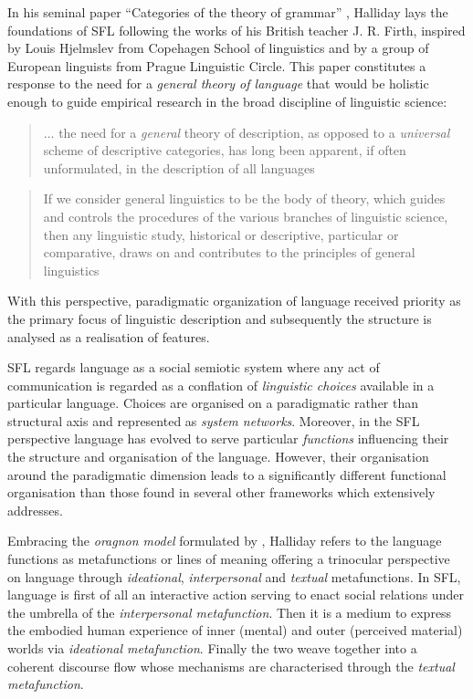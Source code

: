 In his seminal paper ``Categories of the theory of grammar'' \citep{Halliday61-orig}, Halliday lays the foundations of SFL following the works of his British teacher J. R. Firth, inspired by Louis Hjelmslev \citep{Hjelmslev53} from Copehagen School of linguistics and by a group of European linguists from Prague Linguistic Circle. This paper constitutes a response to the need for a \textit{general theory of language} that would be holistic enough to guide empirical research in the broad discipline of linguistic science:
\begin{quotation}
    ... the need for a \textit{general} theory of description, as opposed to a \textit{universal} scheme of descriptive categories, has long been apparent, if often unformulated, in the description of all languages \citep[p.54; emphasis in original]{Halliday57}
\end{quotation} 
\begin{quotation}
    If we consider general linguistics to be the body of theory, which guides and controls the procedures of the various branches of linguistic science, then any linguistic study, historical or descriptive, particular or comparative, draws on and contributes to the principles of general linguistics \citep[p.55]{Halliday57}
\end{quotation} 

With this perspective, paradigmatic organization of language received priority as the primary focus of linguistic description and subsequently the structure is analysed as a realisation of features. 


SFL regards language as a social semiotic system where any act of communication is regarded as a conflation of \textit{linguistic choices} available in a particular language. Choices are organised on a paradigmatic rather than structural axis and represented as \textit{system networks}. Moreover, in the SFL perspective language has evolved to serve particular \textit{functions} influencing their the structure and organisation of the language. However, their organisation around the paradigmatic dimension leads to a significantly different functional organisation than those found in several other frameworks which \citet{Butler2003-pt1, Butler2003-pt2} extensively addresses. 

Embracing the \textit{oragnon model} formulated by \citet{Buhler34}, Halliday refers to the language functions as metafunctions or lines of meaning offering a trinocular perspective on language through \textit{ideational}, \textit{interpersonal} and \textit{textual} metafunctions. In SFL, language is first of all an interactive action serving to enact social relations under the umbrella of the \textit{interpersonal metafunction}. Then it is a medium to express the embodied human experience of inner (mental) and outer (perceived material) worlds via \textit{ideational metafunction}. Finally the two weave together into a coherent discourse flow whose mechanisms are characterised through the \textit{textual metafunction}.


